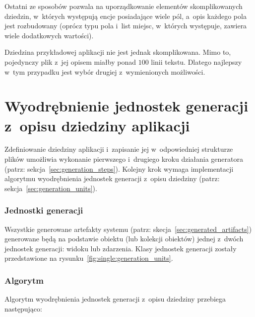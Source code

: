 


Ostatni ze sposobów pozwala na uporządkowanie elementów skomplikowanych dziedzin, w~których występują encje posiadające wiele pól, a~opis każdego pola jest rozbudowany (oprócz typu pola i~list miejsc, w~których występuje, zawiera wiele dodatkowych wartości).

Dziedzina przykładowej aplikacji nie jest jednak skomplikowana.
Mimo to, pojedynczy plik z~jej opisem miałby ponad $100$ linii tekstu.
Dlatego najlepszy w~tym przypadku jest wybór drugiej z~wymienionych możliwości.



\section{Wyodrębnienie jednostek generacji z~opisu dziedziny aplikacji} \label{sec:gen_units_extraction}

Zdefiniowanie dziedziny aplikacji i~zapisanie jej w~odpowiedniej strukturze plików umożliwia wykonanie pierwszego i~drugiego kroku działania generatora (patrz: sekcja~\ref{sec:generation_steps}).
Kolejny krok wymaga implementacji algorytmu wyodrębnienia jednostek generacji z~opisu dziedziny (patrz: sekcja~\ref{sec:generation_units}).

\subsubsection{Jednostki generacji}

Wszystkie generowane artefakty systemu (patrz: skecja~\ref{sec:generated_artifacts}) generowane będą na podstawie obiektu (lub kolekcji obiektów) jednej z~dwóch jednostek generacji: widoku lub zdarzenia.
Klasy jednostek generacji zostały przedstawione na rysunku~\ref{fig:single:generation_units}.



\subsubsection{Algorytm}

Algorytm wyodrębnienia jednostek generacji z~opisu dziedziny przebiega następująco:

